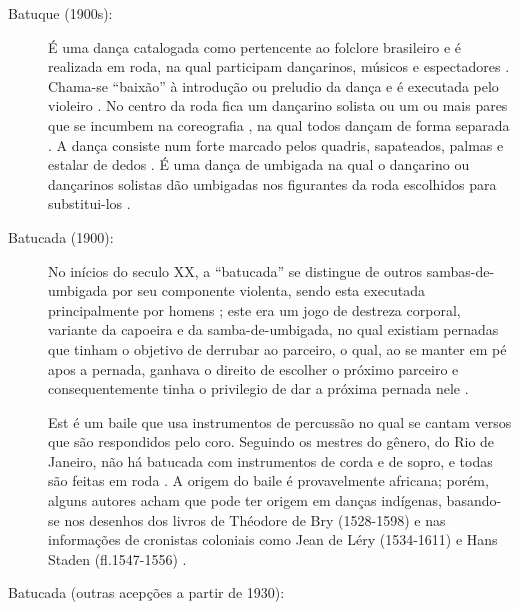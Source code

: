 \begin{description}
\item [Batuque (1900s):]
\label{ref:batuquedanca}
É uma dança catalogada como pertencente ao folclore brasileiro  \cite[pp. 96]{sandroni2001feitico} e
é realizada em roda, na qual participam dançarinos, músicos e espectadores \cite[pp. 89]{marcondes1977enciclopedia}.
Chama-se ``baixão'' à introdução ou preludio da dança  e é executada pelo violeiro  \cite[pp. 89]{marcondes1977enciclopedia}.
No centro da roda fica um dançarino solista ou um ou mais pares
que se incumbem na coreografia \cite[pp. 89]{marcondes1977enciclopedia},
na qual todos dançam de forma separada \cite[pp. 65]{sandroni2001feitico}.
A dança consiste num forte marcado pelos quadris, sapateados, palmas e estalar de dedos  \cite[pp. 89]{marcondes1977enciclopedia}.
É uma dança de umbigada \cite[pp. 96]{sandroni2001feitico} \cite[pp. 89]{marcondes1977enciclopedia} 
na qual o dançarino ou dançarinos solistas
dão umbigadas nos figurantes da roda  escolhidos para substitui-los \cite[pp. 89]{marcondes1977enciclopedia}.



\item [Batucada (1900):]
\label{ref:batucadadanca}
No inícios do seculo XX,
a ``batucada'' se distingue de outros sambas-de-umbigada por seu componente violenta, 
sendo esta executada principalmente por homens \cite[pp. 8]{reffolclorebatucadajornal} \cite[pp. 103]{sandroni2001feitico};
este era um jogo de destreza corporal, variante da capoeira e da samba-de-umbigada,
no qual existiam pernadas que tinham o objetivo de derrubar ao parceiro, o qual, ao se manter em pé apos a pernada,
ganhava o direito de escolher o próximo parceiro
 e consequentemente tinha o privilegio de dar a próxima pernada nele \cite[pp. 103]{sandroni2001feitico}.

Est é um baile que usa instrumentos de percussão no qual se cantam versos que são respondidos pelo coro.
Seguindo os mestres do gênero, do Rio de Janeiro, 
não há batucada com instrumentos de corda e de sopro, 
e  todas são feitas em roda \cite[pp. 89]{marcondes1977enciclopedia}.
A origem do baile é provavelmente africana; porém, alguns autores acham que pode ter origem em  danças indígenas,
basando-se nos desenhos dos livros de Théodore de Bry (1528-1598) e
nas informações de cronistas coloniais como Jean de Léry (1534-1611) e
Hans Staden (fl.1547-1556) \cite[pp. 89]{marcondes1977enciclopedia}.


\item [Batucada (outras acepções a partir de 1930):]
\label{ref:batucadadanca1930}


\end{description}
